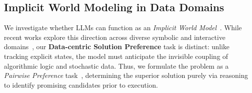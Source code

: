 \subsection{Implicit World Modeling in Data Domains}
\label{sec:implicit_modeling}

We investigate whether LLMs can function as an \textit{Implicit World Model}~\cite{ha2018worldmodels, hafner2024masteringdiversedomainsworld}.
While recent works explore this direction across diverse symbolic and interactive domains~\cite{li2025wordworldlargelanguage, faircodegenteam2025cwmopenweightsllmresearch, Just2024datacentrichuman}, our \textbf{Data-centric Solution Preference} task is distinct:
unlike tracking explicit states, the model must anticipate the invisible coupling of algorithmic logic and stochastic data.
Thus, we formulate the problem as a \textit{Pairwise Preference} task~\cite{Shen2024towardsdatacentricrlhf}, determining the superior solution purely via reasoning to identify promising candidates prior to execution.